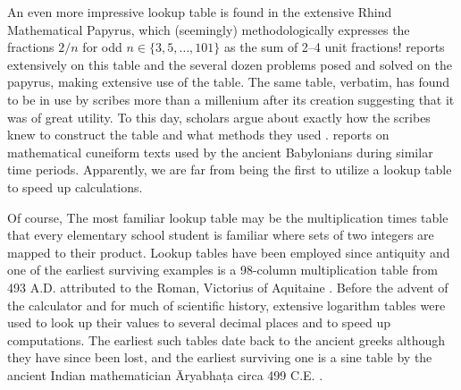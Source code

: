 
An even more impressive lookup table is found in the extensive Rhind Mathematical Papyrus, which (seemingly) methodologically expresses the fractions $2/n$ for odd $n \in \lbrace 3, 5, \dots, 101 \rbrace$ as the sum of 2--4 unit fractions! \citet{Gillings82} reports extensively on this table and the several dozen problems posed and solved on the papyrus, making extensive use of the table. The same table, verbatim, has found to be in use by scribes more than a millenium after its creation suggesting that it was of great utility. To this day, scholars argue about exactly how the scribes knew to construct the table and what methods they used \citep{Gillings74,Abdulaziz08}. \citet{Neugebauer45} reports on mathematical cuneiform texts used by the ancient Babylonians during similar time periods. Apparently, we are far from being the first to utilize a lookup table to speed up calculations.

Of course, 
The most familiar lookup table may be the multiplication times table that every elementary school student is familiar where sets of two integers are mapped to their product. Lookup tables have been employed since antiquity and one of the earliest surviving examples is a 98-column multiplication table from 493 A.D. attributed to the Roman, Victorius of Aquitaine \citep{Maher01}. Before the advent of the calculator and for much of scientific history, extensive logarithm tables were used to look up their values to several decimal places and to speed up computations. The earliest such tables date back to the ancient greeks although they have since been lost, and the earliest surviving one is a sine table by the ancient Indian mathematician \={A}ryabha\d{t}a circa 499 C.E. \citep{Hayashi97}.

